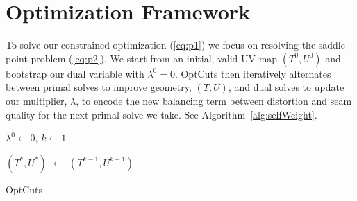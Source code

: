 
\section{Optimization Framework}

To solve our constrained optimization (\ref{eq:p1}) we focus on resolving the saddle-point problem (\ref{eq:p2}). 
We start from an initial, valid UV map $(T^0, U^0)$ and bootstrap our dual variable with $\lambda^0 = 0$. OptCuts then iteratively alternates between primal solves to improve geometry, $(T, U)$, and dual solves to update our multiplier, $\lambda$, to encode the new balancing term between distortion and seam quality for the next primal solve we take. See Algorithm~\ref{alg:selfWeight}.

\begin{algorithm}[!h]
\SetAlgoLined
{}

$\lambda^0 \leftarrow 0$, $k \leftarrow 1$\;

$(T^*, U^*)$ $ \leftarrow$ $(T^{k-1}, U^{k-1})$\; 

\caption{OptCuts}
\label{alg:selfWeight}
\end{algorithm}

%
%


